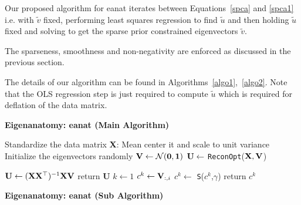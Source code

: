 \documentclass{elsarticle}\usepackage{graphicx, color}
\begin{document}
Our proposed algorithm for eanat iterates between Equations~\ref{spca} and \ref{spca1} i.e. with ${\tilde{v}}$ fixed, performing least squares regression to find  ${\tilde{u}}$ and then holding  ${\tilde{u}}$ fixed and solving to get the sparse prior constrained eigenvectors ${\tilde{v}}$. 


The sparseness, smoothness and non-negativity are enforced as discussed in the previous section.

 The details of our algorithm can be found in Algorithms~\ref{algo1},~\ref{algo2}. Note that the OLS regression step is just required to compute $\tilde{u}$ which is required for deflation of the data matrix.

\begin{algorithm}[htbp]
\small \caption{\bf  Eigenanatomy: eanat (Main Algorithm)}
\label{algo1}
Standardize the data matrix {\bf X}: Mean center it and scale to unit variance\;
Initialize the eigenvectors randomly ${\bf V \gets \mathcal{N}(0,1)}$\;
${\bf U} \gets$ {\texttt {ReconOpt}}(${\bf X}, {\bf V}$)\;
\end{algorithm}
\begin{algorithm}[htbp]
\label{algo2}
\DontPrintSemicolon
{} \;
\;
{
\hspace{0.5cm}	${\bf U}   \gets ({\bf XX^{\top}})^{-1}{\bf XV}$ \;
\hspace{0.5cm} return {\bf U}
}
\;
 \;
{
\hspace{0.5cm}$k \gets 1$\;
\hspace{0.5cm}${c}^k \gets {\bf V}_{:,i}$ \;
\hspace{0.5cm}${c}^k \gets$ {\texttt S}(${c}^k$,$\gamma$) \;
\hspace{0.5cm} return ${c^k}$
}
\small \caption{\bf Eigenanatomy: eanat (Sub Algorithm)}
\end{algorithm}
\end{document}
